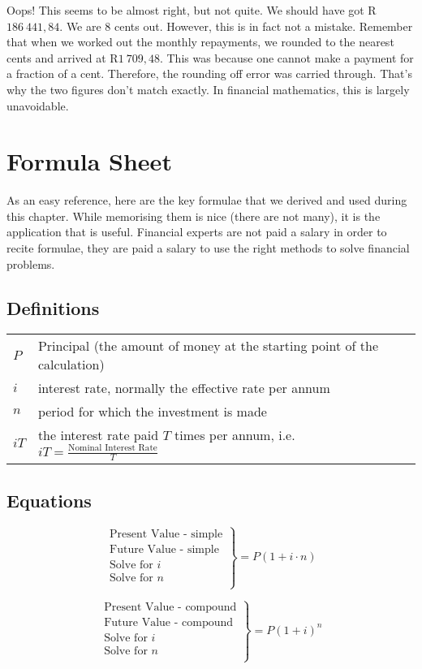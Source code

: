 Oops! This seems to be almost right, but not quite. We should have got R$186~441,84$. We are $8$ cents out. However, this is in fact not a mistake. Remember that when we worked out the monthly repayments, we rounded to the nearest cents and arrived at R$1~709,48$. This was because one cannot make a payment for a fraction of a cent. Therefore, the rounding off error was carried through. That's why the two figures don't match exactly. In financial mathematics, this is largely unavoidable.


\section{Formula Sheet}
As an easy reference, here are the key formulae that we derived and used during this chapter. While memorising them is nice (there are not many), it is the application that is useful. Financial experts are not paid a salary in order to recite formulae, they are paid a salary to use the right methods to solve financial problems.

\subsection{Definitions}
\begin{tabular}{ll}
$P$ &Principal (the amount of money at the starting point of the calculation)\\
$i$ &interest rate, normally the effective rate per annum\\
$n$ &period for which the investment is made\\
$iT$ &the interest rate paid $T$ times per annum, i.e. $iT = \frac{\mbox{Nominal Interest Rate}}{T}$
\end{tabular}

\subsection{Equations}
\begin{equation*}
\left.\begin{array}{l}
\mbox{Present Value - simple}\\
\mbox{Future Value - simple} \\
\mbox{Solve for $i$}\\
\mbox{Solve for $n$}\\
\end{array}\right\}= P (1 + i \cdot n)
\end{equation*}

\begin{equation*}
\left.\begin{array}{l}
\mbox{Present Value - compound}\\
\mbox{Future Value - compound} \\
\mbox{Solve for $i$}\\
\mbox{Solve for $n$}\\
\end{array}\right\}= P (1+i)^n
\end{equation*}

